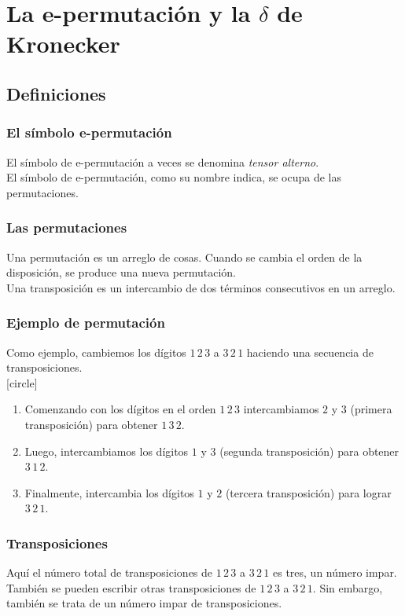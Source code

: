 \documentclass[12pt]{beamer}
\begin{document}
\section{La e-permutación y la \texorpdfstring{$\delta$}{d} de Kronecker}
\subsection{Definiciones}

\begin{frame}
\frametitle{El símbolo e-permutación}
El símbolo de e-permutación a veces se denomina \emph{tensor alterno}.
\\
\bigskip
El símbolo de e-permutación, como su nombre indica, se ocupa de las permutaciones.
\end{frame}
\begin{frame}
\frametitle{Las permutaciones}
Una permutación es un arreglo de cosas. Cuando se cambia el orden de la disposición, se produce una nueva permutación.
\\
\bigskip
\pause
Una transposición es un intercambio de dos términos consecutivos en un arreglo.
\end{frame}
\begin{frame}
\frametitle{Ejemplo de permutación}
Como ejemplo, cambiemos los dígitos $1 \, 2 \, 3$ a $3 \, 2 \, 1$ haciendo una secuencia de transposiciones.
\\
\bigskip
\pause
{}
[circle]
\begin{enumerate}[<+->]
\item Comenzando con los dígitos en el orden $1 \, 2 \, 3$ intercambiamos $2$ y $3$ (primera transposición) para obtener $1 \, 3 \, 2$. \item Luego, intercambiamos los dígitos $1$ y $3$ (segunda transposición) para obtener $3 \, 1 \, 2$.
\item Finalmente, intercambia los dígitos $1$ y $2$ (tercera transposición) para lograr $3 \, 2 \, 1$. 
\end{enumerate}
\end{frame}
\begin{frame}
\frametitle{Transposiciones}
Aquí el número total de transposiciones de $1 \, 2 \, 3$ a $3 \, 2 \, 1$ es tres, un número impar.
\\
\bigskip
\pause
También se pueden escribir otras transposiciones de $1 \, 2 \, 3$ a $3 \, 2 \, 1$. Sin embargo, también se trata de un número impar de transposiciones.
\end{frame}
\end{document}
